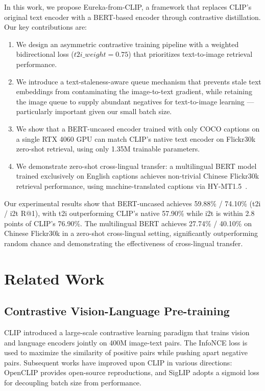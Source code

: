 \documentclass[10pt,leqno]{amsart}
\begin{document}
In this work, we propose Eureka-from-CLIP, a framework that replaces CLIP's original text encoder with a BERT-based encoder \citep{devlin2019bert} through contrastive distillation. Our key contributions are:

\begin{enumerate}
    \item We design an asymmetric contrastive training pipeline with a weighted bidirectional loss ($t2i\_weight = 0.75$) that prioritizes text-to-image retrieval performance.
    \item We introduce a text-staleness-aware queue mechanism that prevents stale text embeddings from contaminating the image-to-text gradient, while retaining the image queue to supply abundant negatives for text-to-image learning --- particularly important given our small batch size.
    \item We show that a BERT-uncased encoder trained with only COCO captions \citep{lin2014coco} on a single RTX 4060 GPU can match CLIP's native text encoder on Flickr30k \citep{plummer2015flickr30k} zero-shot retrieval, using only 1.35M trainable parameters.
    \item We demonstrate zero-shot cross-lingual transfer: a multilingual BERT model trained exclusively on English captions achieves non-trivial Chinese Flickr30k retrieval performance, using machine-translated captions via HY-MT1.5~\citep{hymt152025tencent}.
\end{enumerate}

Our experimental results show that BERT-uncased achieves 59.88\% / 74.10\% (t2i / i2t R@1), with t2i outperforming CLIP's native 57.90\% while i2t is within 2.8 points of CLIP's 76.90\%. The multilingual BERT achieves 27.74\% / 40.10\% on Chinese Flickr30k in a zero-shot cross-lingual setting, significantly outperforming random chance and demonstrating the effectiveness of cross-lingual transfer.

\section{Related Work}

\subsection{Contrastive Vision-Language Pre-training}

CLIP \citep{radford2021clip} introduced a large-scale contrastive learning paradigm that trains vision and language encoders jointly on 400M image-text pairs. The InfoNCE loss \citep{oord2018representation} is used to maximize the similarity of positive pairs while pushing apart negative pairs. Subsequent works have improved upon CLIP in various directions: OpenCLIP provides open-source reproductions, and SigLIP \citep{zhai2023sigmoid} adopts a sigmoid loss for decoupling batch size from performance.
\end{document}

